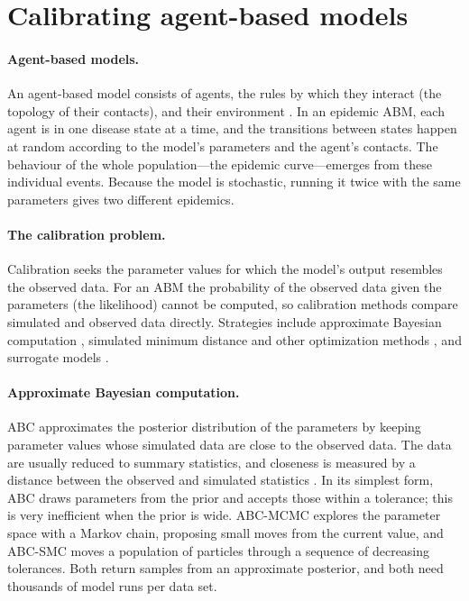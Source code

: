 \documentclass[12pt]{article}
\begin{document}
\section{Calibrating agent-based models}\label{sec:background}

\paragraph{Agent-based models.} An agent-based model consists of agents, the rules by which they
interact (the topology of their contacts), and their environment
\autocite{railsbackAgentbasedIndividualbasedModeling2019}. In an epidemic ABM, each agent is in one
disease state at a time, and the transitions between states happen at random according to the
model's parameters and the agent's contacts. The behaviour of the whole population---the epidemic
curve---emerges from these individual events. Because the model is stochastic, running it twice
with the same parameters gives two different epidemics.

\paragraph{The calibration problem.} Calibration seeks the parameter values for which the model's
output resembles the observed data. For an ABM the probability of the observed data given the
parameters (the likelihood) cannot be computed, so calibration methods compare simulated and
observed data directly. Strategies include approximate Bayesian computation
\autocite{toniApproximateBayesianComputation2008,gozzi2022preliminary}, simulated minimum distance
and other optimization methods \autocite{platt2020comparison}, and surrogate models
\autocite{lampertiAgentbasedModelCalibration2018,jalalBayCANNStreamliningBayesian2021,zhang2020validation}.

\paragraph{Approximate Bayesian computation.} ABC approximates the posterior distribution of the
parameters by keeping parameter values whose simulated data are close to the observed data. The
data are usually reduced to summary statistics, and closeness is measured by a distance between the
observed and simulated statistics \autocite{beaumont2002approximate}. In its simplest form, ABC
draws parameters from the prior and accepts those within a tolerance; this is very inefficient when
the prior is wide. ABC-MCMC \autocite{marjoramMarkovChainMonte2003} explores the parameter space
with a Markov chain, proposing small moves from the current value, and ABC-SMC
\autocite{toniApproximateBayesianComputation2008,beaumont2009adaptive} moves a population of
particles through a sequence of decreasing tolerances. Both return samples from an approximate
posterior, and both need thousands of model runs per data set.
\end{document}
